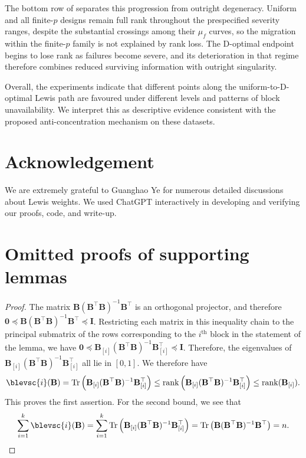 \documentclass[11pt]{article}
\theoremstyle{plain}
\numberwithin{equation}{section}
\newcommand{\Tr}{\operatorname{Tr}}
\newcommand{\rank}{\operatorname{rank}}
\newcommand{\bB}{\mathbf{B}}
\newcommand{\bI}{\mathbf{I}}
\newcommand{\bzero}{\mathbf{0}}
\begin{document}
The bottom row of  separates this progression
from outright degeneracy.  Uniform and all finite-$p$ designs remain
full rank throughout the prespecified severity ranges, despite the
substantial crossings among their $\mu_f$ curves, so the migration
within the finite-$p$ family is not explained by rank loss.  The
D-optimal endpoint  begins to lose rank as failures become
severe, and its deterioration in that regime therefore combines reduced
surviving information with outright singularity.

Overall, the experiments indicate that different points along the
uniform-to-D-optimal Lewis path are favoured under different levels and
patterns of block unavailability.  We interpret this as descriptive
evidence consistent with the proposed anti-concentration mechanism on
these  datasets.

\section*{Acknowledgement}
We are extremely grateful to Guanghao Ye for numerous detailed  discussions about Lewis weights. We used ChatGPT interactively in developing and verifying our proofs, code, and write-up.  

\newpage 

\printbibliography

\newpage 
\appendix 
\section{Omitted proofs of supporting lemmas}\label{sec:app-technical-lemmas}
\blocklevscfact* 
\begin{proof}
The matrix $\bB(\bB^\top \bB)^{-1}\bB^\top$ is an orthogonal projector, and therefore $\bzero\preceq \bB(\bB^\top \bB)^{-1}\bB^\top \preceq \bI$. Restricting each matrix in this inequality chain to the principal submatrix of the rows corresponding to the $i^\mathrm{th}$ block in the statement of the lemma, we have $\bzero\preceq \bB_{[i]}(\bB^\top \bB)^{-1}\bB_{[i]}^\top\preceq \bI$. Therefore, the eigenvalues of $\bB_{[i]}(\bB^\top \bB)^{-1}\bB_{[i]}^\top$ all lie in $[0, 1]$. We therefore have \[\blevsc{i}(\bB)=\Tr\left( \bB_{[i]}(\bB^\top \bB)^{-1}\bB_{[i]}^\top\right)\leq \rank\left( \bB_{[i]}(\bB^\top \bB)^{-1}\bB_{[i]}^\top\right)\leq \rank(\bB_{[i]}).\]This proves the first assertion. For the second bound, we see that \[\sum_{i=1}^k \blevsc{i}(\bB) = \sum_{i=1}^k\Tr\left( \bB_{[i]}(\bB^\top \bB)^{-1}\bB_{[i]}^\top\right) = \Tr\left( \bB(\bB^\top \bB)^{-1}\bB^\top\right) = n.\]
\end{proof}
\end{document}

